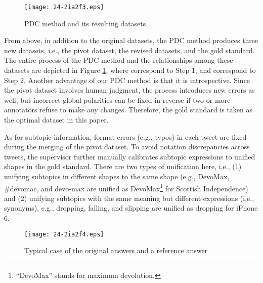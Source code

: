 \documentclass[english]{jnlp_1.4}
\begin{document}
\begin{figure}[b]
\begin{center}
\texttt{[image: 24-2ia2f3.eps]}
\end{center}
\caption{PDC method and its resulting datasets}
\label{fig:PDC_flowchart}
\end{figure}

From above, in addition to the original datasets, the PDC method produces three new datasets, i.e., the pivot dataset, the revised datasets, and the gold standard. The entire process of the PDC method and the relationships among these datasets are depicted in Figure \ref{fig:PDC_flowchart}, where  correspond to Step 1, and  correspond to Step 2. Another advantage of our PDC method is that it is introspective. Since the pivot dataset involves human judgment, the process introduces new errors as well, but incorrect global polarities can be fixed in reverse if two or more annotators refuse to make any changes. Therefore, the gold standard is taken as the optimal dataset in this paper.

As for subtopic information, format errors (e.g., typos) in each tweet are fixed during the merging of the pivot dataset. To avoid notation discrepancies across tweets, the supervisor further manually calibrates subtopic expressions to unified shapes in the gold standard. There are two types of unification here, i.e., (1) unifying subtopics in different shapes to the same shape (e.g., DevoMax, \#devomac, and devo-max are unified as DevoMax\footnote{``DevoMax'' stands for maximum devolution.} for Scottish Independence) and (2) unifying subtopics with the same meaning but different expressions (i.e., synonyms), e.g., dropping, falling, and slipping are unified as dropping for iPhone 6.

\begin{figure}[b]
\begin{center}
\texttt{[image: 24-2ia2f4.eps]}
\end{center}
\caption{Typical case of the original answers and a reference answer}
\label{fig:PDC_case}
\end{figure}
\end{document}
